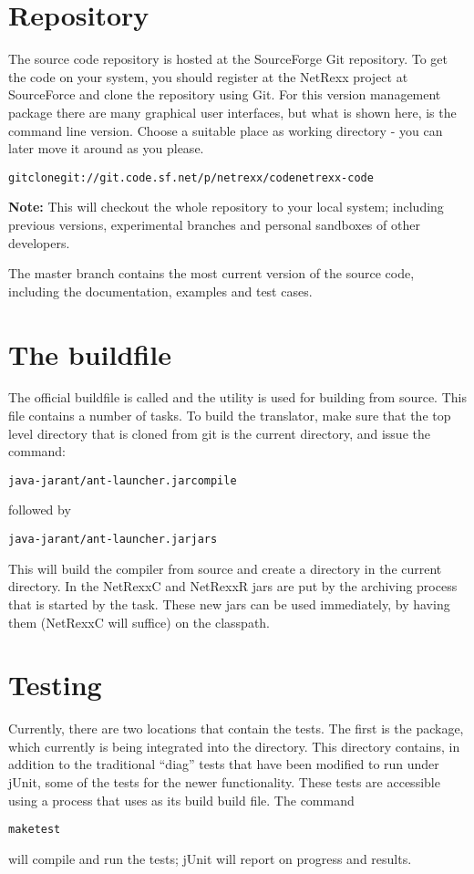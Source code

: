{\section{Repository}
The \nr{} source code repository is hosted at the SourceForge Git repository. To get the code
on your system, you should register at the NetRexx project at SourceForce and clone the repository
using Git. For this version management package there are many
graphical user interfaces, but what is shown here, is the command line
version. Choose a suitable place as working directory - you can later
move it around as you please.
\begin{alltt}
git clone git://git.code.sf.net/p/netrexx/code netrexx-code
\end{alltt}

\begin{shaded}\noindent
\textbf{Note:} This will checkout
the whole repository to your local system; including previous
versions, experimental branches and personal sandboxes of other
developers. 
\end{shaded}\noindent
The master branch contains the most current version of the source
code, including the documentation, examples and test cases. 
\section{The buildfile}
The official buildfile is called  and the
 utility is used for building \nr{} from source. This
file contains a number of tasks. To build
the translator, make sure that the top level directory that is cloned from git is the
current directory, and issue the command:
\begin{alltt}
java -jar ant/ant-launcher.jar compile
\end{alltt}
followed by
\begin{alltt}
java -jar ant/ant-launcher.jar jars
\end{alltt}
This will build the compiler from source and create a 
directory in the current directory. In  the
NetRexxC and NetRexxR jars are put by the archiving process that is
started by the  task. These new jars can be used
immediately, by having them (NetRexxC will suffice) on the classpath.
\section{Testing}
Currently, there are two locations that contain the tests. The first
is the  package, which currently is
being integrated into the  directory. This
directory contains, in addition to the traditional ``diag'' tests that
have been modified to run under jUnit, some of the tests for the newer
functionality. These tests are accessible using a 
process that uses  as its build build file. The
command
\begin{alltt}
make test
\end{alltt}
will compile and run the tests; jUnit will report on progress and
results.

}
